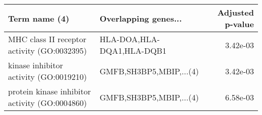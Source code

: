 \begin{tabular}{llr}
\toprule
                                 Term name (4) &      Overlapping genes... &  Adjusted p-value \\
\midrule
   MHC class II receptor activity (GO:0032395) & HLA-DOA,HLA-DQA1,HLA-DQB1 &          3.42e-03 \\
        kinase inhibitor activity (GO:0019210) &   GMFB,SH3BP5,MBIP,...(4) &          3.42e-03 \\
protein kinase inhibitor activity (GO:0004860) &   GMFB,SH3BP5,MBIP,...(4) &          6.58e-03 \\
\bottomrule
\end{tabular}
